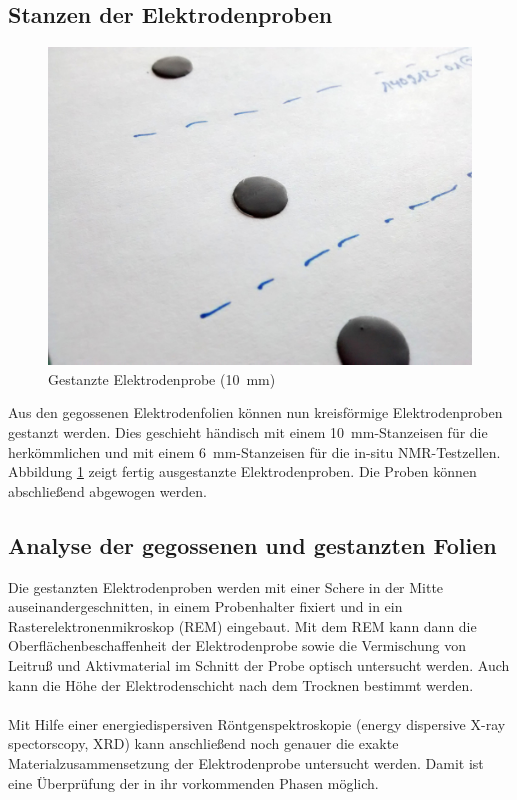 \documentclass[a4paper, 11pt, headsepline,footsepline,twoside,abstract]{scrbook}
\begin{document}
\subsection{Stanzen der Elektrodenproben}
\begin{figure}
	\centering
	\includegraphics[width=0.9\columnwidth]{images/Kathodenprobe.jpg}
	\caption{Gestanzte Elektrodenprobe (\SI{10}{\milli\metre})}
	\label{elektrode_gestanzt}
\end{figure}
Aus den gegossenen Elektrodenfolien können nun kreisförmige Elektrodenproben gestanzt werden. Dies geschieht händisch mit einem \SI{10}{\milli\metre}-Stanzeisen für die herkömmlichen und mit einem \SI{6}{\milli\metre}-Stanzeisen für die in-situ NMR-Testzellen. Abbildung \ref{elektrode_gestanzt} zeigt fertig ausgestanzte Elektrodenproben. Die Proben können abschließend abgewogen werden.
\subsection{Analyse der gegossenen und gestanzten Folien}
Die gestanzten Elektrodenproben werden mit einer Schere in der Mitte auseinandergeschnitten, in einem Probenhalter fixiert und in ein Rasterelektronenmikroskop (REM) eingebaut. Mit dem REM kann dann die Oberflächenbeschaffenheit der Elektrodenprobe sowie die Vermischung von Leitruß und Aktivmaterial im Schnitt der Probe optisch untersucht werden. Auch kann die Höhe der Elektrodenschicht nach dem Trocknen bestimmt werden.
\\\\
Mit Hilfe einer energiedispersiven Röntgenspektroskopie (energy dispersive X-ray spectorscopy, XRD) kann anschließend noch genauer die exakte Materialzusammensetzung der Elektrodenprobe untersucht werden. Damit ist eine Überprüfung der in ihr vorkommenden Phasen möglich.
\end{document}
